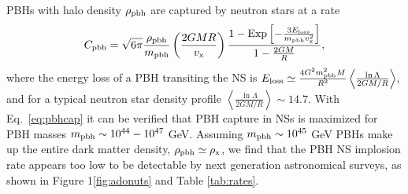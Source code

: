 \documentclass[nofootinbib,longbibliography,prd,floatfix,superscriptaddress,twocolumn]{revtex4-1}
\begin{document}
PBHs with halo density $\rho_{\rm pbh}$ are captured by neutron stars at a rate \cite{Capela:2013yf}
\begin{align}
C_{\rm pbh}=\sqrt{6\pi}\frac{\rho_{\rm pbh}}{m_{\rm pbh}}\left(\frac{2 G M R}{v_{\rm x}}\right) \frac{1-{\rm Exp}\left[-\frac{3E_{\rm loss}}{m_{\rm pbh}v_{\rm x}^2}\right]}{1-\frac{2GM}{R}},
\label{eq:pbhcap}
\end{align}
where the energy loss of a PBH transiting the NS is $E_{\rm loss} \simeq \frac{4 G^2 m^2_{\rm pbh}M}{R^2} \left\langle  \frac{\ln\Lambda}{2 G M / R} \right\rangle$, and for a typical neutron star density profile $ \left\langle \frac{\ln\Lambda}{2 G M / R}\right\rangle \sim 14.7$. With Eq.~\eqref{eq:pbhcap} it can be verified that PBH capture in NSs is maximized for PBH masses $m_{\rm pbh} \sim 10^{44}-10^{47}$ GeV. Assuming $m_{\rm pbh} \sim 10^{45}$ GeV PBHs make up the entire dark matter density, $\rho_{\rm pbh} \simeq \rho_{\rm x}$, we find that the PBH NS implosion rate appears too low to be detectable by next generation astronomical surveys, as shown in Figure 1\ref{fig:adonuts} and Table \ref{tab:rates}.
\end{document}
